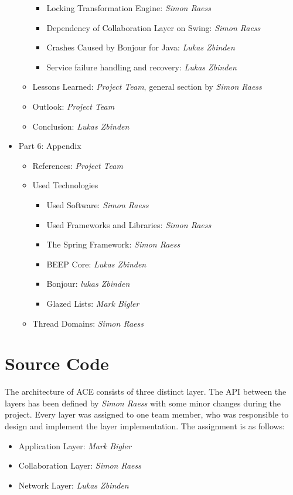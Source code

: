 \begin{itemize}
\begin{itemize}
\begin{itemize}
   \item Locking Transformation Engine: \emph{Simon Raess}
   \item Dependency of Collaboration Layer on Swing: \emph{Simon Raess}
   \item Crashes Caused by Bonjour for Java: \emph{Lukas Zbinden}
   \item Service failure handling and recovery: \emph{Lukas Zbinden}
  \end{itemize}
  \item Lessons Learned: \emph{Project Team}, general section by \emph{Simon Raess}
  \item Outlook: \emph{Project Team}
  \item Conclusion: \emph{Lukas Zbinden}
 \end{itemize}
 \item Part 6: Appendix
 \begin{itemize}
  \item References: \emph{Project Team}
  \item Used Technologies
  \begin{itemize}
   \item Used Software: \emph{Simon Raess}
   \item Used Frameworks and Libraries: \emph{Simon Raess}
   \item The Spring Framework: \emph{Simon Raess}
   \item BEEP Core: \emph{Lukas Zbinden}
   \item Bonjour: \emph{lukas Zbinden}
   \item Glazed Lists: \emph{Mark Bigler}
  \end{itemize}
  \item Thread Domains: \emph{Simon Raess}
 \end{itemize}
\end{itemize}



\section{Source Code}
The architecture of ACE consists of three distinct layer. The 
API between the layers has been defined by \emph{Simon Raess} with some 
minor changes during the project. Every layer
was assigned to one team member, who was responsible to design and implement
the layer implementation. The assignment is as follows:

\begin{itemize}
 \item Application Layer: \emph{Mark Bigler}
 \item Collaboration Layer: \emph{Simon Raess}
 \item Network Layer: \emph{Lukas Zbinden}
\end{itemize}

